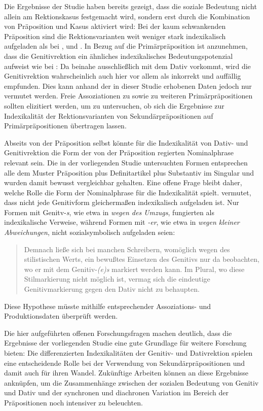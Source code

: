 Die Ergebnisse der Studie haben bereits gezeigt, dass die soziale Bedeutung nicht allein am Rektionskasus festgemacht wird, sondern erst durch die Kombination von Präposition und Kasus aktiviert wird: 
Bei der kaum schwankenden Präposition \gegenueber{} sind die Rektionsvarianten weit weniger stark indexikalisch aufgeladen als bei \wegen, \waehrend{} und \dank. 
In Bezug auf die Primärpräposition  ist anzunehmen, dass die Genitivrektion ein ähnliches indexikalisches Bedeutungspotenzial aufweist wie bei \gegenueber: 
Da  beinahe ausschließlich mit dem Dativ vorkommt, wird die Genitivrektion wahrscheinlich auch hier vor allem als inkorrekt und auffällig empfunden. 
Dies kann anhand der in dieser Studie erhobenen Daten jedoch nur vermutet werden.
Freie Assoziationen zu  sowie zu weiteren Primärpräpositionen sollten elizitiert werden, um zu untersuchen, ob sich die Ergebnisse zur Indexikalität der Rektionsvarianten von Sekundärpräpositionen auf Primärpräpositionen übertragen lassen. 

Abseits von der Präposition selbst könnte für die Indexikalität von Dativ- und Genitivrektion die Form der von der Präposition regierten Nominalphrase relevant sein. 
Die in der vorliegenden Studie untersuchten Formen entsprechen alle dem Muster Präposition plus Definitartikel plus Substantiv im Singular und wurden damit bewusst vergleichbar gehalten. 
Eine offene Frage bleibt daher, welche Rolle die Form der Nominalphrase für die Indexikalität spielt. 
\citet[78]{Lindqvist1994} vermutet, dass nicht jede Genitivform gleicherma{\ss}en indexikalisch aufgeladen ist.
Nur Formen mit Genitv-\textit{s}, wie etwa in \textit{wegen des Umzugs},\textit{ }fungierten als indexikalische Verweise, w{\"a}hrend Formen mit \textit{-er}, wie etwa in \textit{wegen kleiner Abweichungen},\textit{ }nicht sozialsymbolisch aufgeladen seien:
\begin{quote}Demnach lie{\ss}e sich bei manchen Schreibern, wom{\"o}glich wegen des stilistischen Werts, ein bewu{\ss}tes Einsetzen des Genitivs nur da beobachten, wo er mit dem Genitiv-\textit{(e)s} markiert werden kann. Im Plural, wo diese Stilmarkierung nicht m{\"o}glich ist, vermag sich die eindeutige Genitivmarkierung gegen den Dativ nicht zu behaupten.~\citep[78]{Lindqvist1994}\end{quote}
Diese Hypothese müsste mithilfe entsprechender Assoziations- und Produktionsdaten überprüft werden. 

Die hier aufgeführten offenen Forschungsfragen machen deutlich, dass die Ergebnisse der vorliegenden Studie eine gute Grundlage für weitere Forschung bieten: 
Die differenzierten Indexikalitäten der Genitiv- und Dativrektion spielen eine entscheidende Rolle bei der Verwendung von Sekundärpräpositionen und damit auch für ihren Wandel. 
Zukünftige Arbeiten können an diese Ergebnisse anknüpfen, um die Zusammenhänge zwischen der sozialen Bedeutung von Genitiv und Dativ und der synchronen und diachronen Variation im Bereich der Präpositionen noch intensiver zu beleuchten. 

